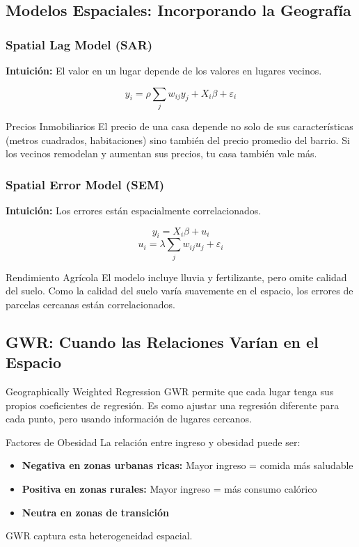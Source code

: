 \documentclass[12pt,a4paper]{article}
\begin{document}
\subsection{Modelos Espaciales: Incorporando la Geografía}

\subsubsection{Spatial Lag Model (SAR)}

\textbf{Intuición:} El valor en un lugar depende de los valores en lugares vecinos.

$$y_i = \rho \sum_j w_{ij} y_j + X_i\beta + \varepsilon_i$$

\begin{ejemplo}{Precios Inmobiliarios}
El precio de una casa depende no solo de sus características (metros cuadrados, habitaciones) sino también del precio promedio del barrio. Si los vecinos remodelan y aumentan sus precios, tu casa también vale más.
\end{ejemplo}

\subsubsection{Spatial Error Model (SEM)}

\textbf{Intuición:} Los errores están espacialmente correlacionados.

$$y_i = X_i\beta + u_i$$
$$u_i = \lambda \sum_j w_{ij} u_j + \varepsilon_i$$

\begin{ejemplo}{Rendimiento Agrícola}
El modelo incluye lluvia y fertilizante, pero omite calidad del suelo. Como la calidad del suelo varía suavemente en el espacio, los errores de parcelas cercanas están correlacionados.
\end{ejemplo}

\subsection{GWR: Cuando las Relaciones Varían en el Espacio}

\begin{conceptbox}{Geographically Weighted Regression}
GWR permite que cada lugar tenga sus propios coeficientes de regresión. Es como ajustar una regresión diferente para cada punto, pero usando información de lugares cercanos.
\end{conceptbox}

\begin{ejemplo}{Factores de Obesidad}
La relación entre ingreso y obesidad puede ser:
\begin{itemize}
    \item \textbf{Negativa en zonas urbanas ricas:} Mayor ingreso = comida más saludable
    \item \textbf{Positiva en zonas rurales:} Mayor ingreso = más consumo calórico
    \item \textbf{Neutra en zonas de transición}
\end{itemize}
GWR captura esta heterogeneidad espacial.
\end{ejemplo}
\end{document}
